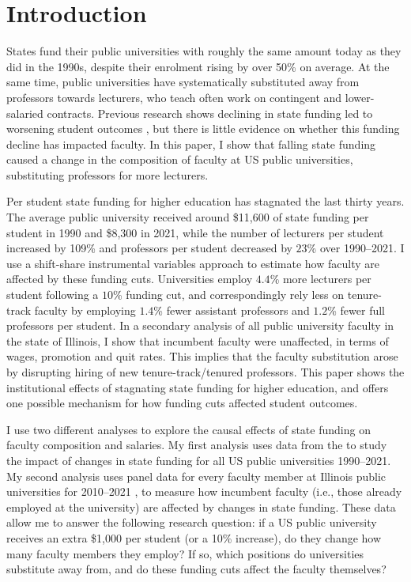 \section{Introduction}
\label{sec:intro}

States fund their public universities with roughly the same amount today as they did in the 1990s, despite their enrolment rising by over 50\% on average.
At the same time, public universities have systematically substituted away from professors towards lecturers, who teach often work on contingent and lower-salaried contracts.
Previous research shows declining in state funding led to worsening student outcomes \citep{NBERw23736,NBERw27885}, but there is little evidence on whether this funding decline has impacted faculty.
In this paper, I show that falling state funding caused a change in the composition of faculty at US public universities, substituting professors for more lecturers.

Per student state funding for higher education has stagnated the last thirty years.
The average public university received around \$11,600 of state funding per student in 1990 and \$8,300 in 2021, while the number of lecturers per student increased by 109\% and professors per student decreased by $23$\% over 1990--2021.
I use a shift-share instrumental variables approach to estimate how faculty are affected by these funding cuts.
Universities employ $4.4$\% more lecturers per student following a $10$\% funding cut, and correspondingly rely less on tenure-track faculty by employing $1.4$\% fewer assistant professors and $1.2$\% fewer full professors per student.
In a secondary analysis of all public university faculty in the state of Illinois, I show that incumbent faculty were unaffected, in terms of wages, promotion and quit rates.
This implies that the faculty substitution arose by disrupting hiring of new tenure-track/tenured professors.
This paper shows the institutional effects of stagnating state funding for higher education, and offers one possible mechanism for how funding cuts affected student outcomes.

I use two different analyses to explore the causal effects of state funding on faculty composition and salaries.
My first analysis uses data from the \cite{ipeds} to study the impact of changes in state funding for all US public universities 1990--2021.
My second analysis uses panel data for every faculty member at Illinois public universities for 2010--2021 \citep{ibhed}, to measure how incumbent faculty (i.e., those already employed at the university) are affected by changes in state funding.
These data allow me to answer the following research question: if a US public university receives an extra \$1,000 per student (or a 10\% increase), do they change how many faculty members they employ?
If so, which positions do universities substitute away from, and do these funding cuts affect the faculty themselves?

